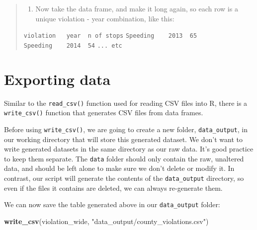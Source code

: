 \documentclass[
]{book}
\newenvironment{Shaded}{\begin{snugshade}}{\end{snugshade}}
\newcommand{\FunctionTok}[1]{\textcolor[rgb]{0.13,0.29,0.53}{\textbf{#1}}}
\newcommand{\NormalTok}[1]{#1}
\newcommand{\StringTok}[1]{\textcolor[rgb]{0.31,0.60,0.02}{#1}}
\providecommand{\tightlist}{%
  \setlength{\itemsep}{0pt}\setlength{\parskip}{0pt}}
\begin{document}
\begin{quote}
\begin{enumerate}
\def\labelenumi{\arabic{enumi}.}
\setcounter{enumi}{1}
\tightlist
\item
  Now take the data frame, and make it long again, so each row is a
  unique violation - year combination, like this:
\end{enumerate}

\texttt{violation\ \ \textbar{}\ year\ \textbar{}\ n\ of\ stops}
\texttt{Speeding\ \ \ \textbar{}\ 2013\ \textbar{}\ 65}
\texttt{Speeding\ \ \ \textbar{}\ 2014\ \textbar{}\ 54}
\texttt{...\ etc}
\end{quote}

\hypertarget{exporting-data}{%
\section{Exporting data}\label{exporting-data}}

Similar to the \texttt{read\_csv()} function used for reading CSV files into R, there is a \texttt{write\_csv()} function that generates CSV files from data frames.

Before using \texttt{write\_csv()}, we are going to create a new folder, \texttt{data\_output},
in our working directory that will store this generated dataset. We don't want
to write generated datasets in the same directory as our raw data. It's good
practice to keep them separate. The \texttt{data} folder should only contain the raw,
unaltered data, and should be left alone to make sure we don't delete or modify
it. In contrast, our script will generate the contents of the \texttt{data\_output}
directory, so even if the files it contains are deleted, we can always
re-generate them.

We can now save the table generated above in our \texttt{data\_output}
folder:

\begin{Shaded}
\begin{Highlighting}[]
\FunctionTok{write\_csv}\NormalTok{(violation\_wide, }\StringTok{"data\_output/county\_violations.csv"}\NormalTok{)}
\end{Highlighting}
\end{Shaded}


  
\end{document}
